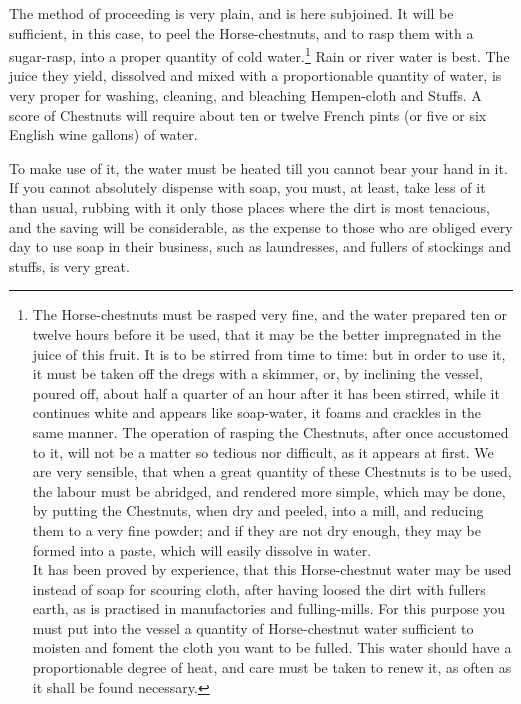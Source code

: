 \documentclass[a4paper, 11pt, oneside, polutonikogreek, english]{article}
\begin{document}
The method of proceeding is very plain, and is here subjoined. It will be sufficient, in this case, to peel the Horse-chestnuts, and to rasp them with a sugar-rasp, into a proper quantity of cold water.\footnote{The Horse-chestnuts must be rasped very fine, and the water prepared ten or twelve hours before it be used, that it may be the better impregnated in the juice of this fruit. It is to be stirred from time to time: but in order to use it, it must be taken off the dregs with a skimmer, or, by inclining the vessel, poured off, about half a quarter of an hour after it has been stirred, while it continues white and appears like soap-water, it foams and crackles in the same manner. The operation of rasping the Chestnuts, after once accustomed to it, will not be a matter so tedious nor difficult, as it appears at first. We are very sensible, that when a great quantity of these Chestnuts is to be used, the labour must be abridged, and rendered more simple, which may be done, by putting the Chestnuts, when dry and peeled, into a mill, and reducing them to a very fine powder; and if they are not dry enough, they may be formed into a paste, which will easily dissolve in water.\\\hspace*{5mm}It has been proved by experience, that this Horse-chestnut water may be used instead of soap for scouring cloth, after having loosed the dirt with fullers earth, as is practised in manufactories and fulling-mills. For this purpose you must put into the vessel a quantity of Horse-chestnut water sufficient to moisten and foment the cloth you want to be fulled. This water should have a proportionable degree of heat, and care must be taken to renew it, as often as it shall be found necessary.} Rain or river water is best. The juice they yield, dissolved and mixed with a proportionable quantity of water, is very proper for washing, cleaning, and bleaching Hempen-cloth and Stuffs. A score of Chestnuts will require about ten or twelve French pints (or five or six English wine gallons) of water.

To make use of it, the water must be heated till you cannot bear your hand in it. If you cannot absolutely dispense with soap, you must, at least, take less of it than usual, rubbing with it only those places where the dirt is most tenacious, and the saving will be considerable, as the expense to those who are obliged every day to use soap in their business, such as laundresses, and fullers of stockings and stuffs, is very great.
\end{document}

